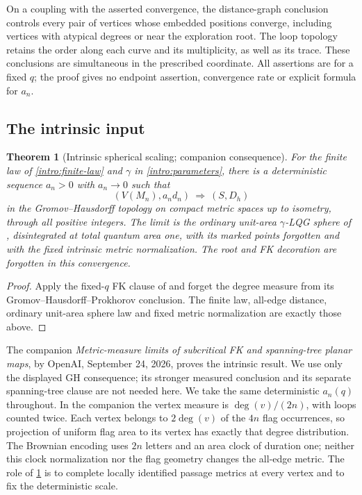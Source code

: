 \documentclass[11pt]{article}
\numberwithin{equation}{section}
\newtheorem{theorem}{Theorem}[section]
\theoremstyle{definition}
\theoremstyle{remark}
\newcommand{\1}{\mathbf 1}
\begin{document}
On a coupling with the asserted convergence, the distance-graph conclusion
controls every pair of vertices whose embedded positions converge,
including vertices with atypical degrees
or near the exploration root. The loop topology retains the order along
each curve and its multiplicity, as well as its trace. These conclusions
are simultaneous in the prescribed coordinate. All assertions are for
a fixed $q$; the proof gives no endpoint assertion, convergence rate
or explicit formula for $a_n$.

\subsection{The intrinsic input}

\begin{theorem}[Intrinsic spherical scaling; companion consequence]
\label{intro:intrinsic-input}
For the finite law of \cref{intro:finite-law} and $\gamma$ in
\eqref{intro:parameters}, there is a deterministic sequence $a_n>0$
with $a_n\to0$ such that
\[
 (V(M_n),a_n d_n)\ \Longrightarrow\ (S,D_h)
\]
in the Gromov--Hausdorff topology on compact metric spaces up to
isometry, through all positive integers. The limit is the ordinary
unit-area $\gamma$-LQG sphere of \citet[Definition~4.21(ii)]{DMSMating},
disintegrated at total quantum area one, with its marked points
forgotten and with the fixed intrinsic metric normalization. The root
and FK decoration are forgotten in this convergence.
\end{theorem}

\begin{proof}
Apply the fixed-$q$ FK clause of \citet[Theorem~1.1]{Intrinsic-input} and
forget the degree measure from its Gromov--Hausdorff--Prokhorov conclusion.
The finite law, all-edge distance, ordinary unit-area sphere law and fixed
metric normalization are exactly those above.
\end{proof}

The companion \emph{Metric-measure limits of subcritical FK and
spanning-tree planar maps}, by OpenAI, September 24, 2026, proves the
intrinsic result. We use only the displayed GH consequence; its stronger
measured conclusion and its separate spanning-tree clause are not needed
here. We take the same deterministic
$a_n(q)$ throughout. In the companion the vertex measure is
$\deg(v)/(2n)$, with loops counted twice. Each vertex belongs to
$2\deg(v)$ of the $4n$ flag occurrences, so projection of uniform flag
area to its vertex has exactly that degree distribution. The Brownian
encoding uses $2n$ letters and an area clock of duration one; neither this
clock normalization nor the flag geometry changes the all-edge metric.
The role of \cref{intro:intrinsic-input} is to complete locally identified
passage metrics at every vertex and to fix the deterministic scale.
\end{document}
